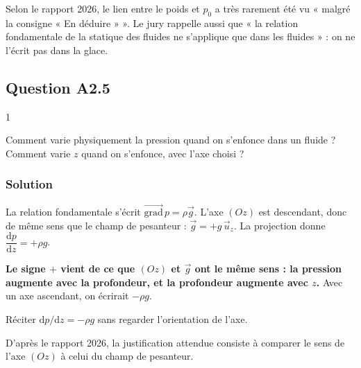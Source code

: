 \documentclass[11pt,a4paper]{article}
\begin{document}
\begin{jury}

Selon le rapport 2026, le lien entre le poids et \(p_0\) a très rarement été vu « malgré la consigne « En déduire » ». Le jury rappelle aussi que « la relation fondamentale de la statique des fluides ne s'applique que dans les fluides » : on ne l'écrit pas dans la glace.

\end{jury}

\hypertarget{question-a2.5}{%
\subsection{Question A2.5}\label{question-a2.5}}

\begin{indication}{1}

Comment varie physiquement la pression quand on s'enfonce dans un fluide ? Comment varie \(z\) quand on s'enfonce, avec l'axe choisi ?

\end{indication}

\hypertarget{solution-13}{%
\subsubsection{Solution}\label{solution-13}}

La relation fondamentale s'écrit \(\overrightarrow{\mathrm{grad}}\,p = \rho\vec g\). L'axe \((Oz)\) est descendant, donc de même sens que le champ de pesanteur : \(\vec g = +g\,\vec u_z\). La projection donne \(\dfrac{\mathrm{d}p}{\mathrm{d}z} = +\rho g\).

\textbf{Le signe \(+\) vient de ce que \((Oz)\) et \(\vec g\) ont le même sens : la pression augmente avec la profondeur, et la profondeur augmente avec \(z\).} Avec un axe ascendant, on écrirait \(-\rho g\).

\begin{piege}

Réciter \(\mathrm{d}p/\mathrm{d}z = -\rho g\) sans regarder l'orientation de l'axe.

\end{piege}

\begin{jury}

D'après le rapport 2026, la justification attendue consiste à comparer le sens de l'axe \((Oz)\) à celui du champ de pesanteur.

\end{jury}
\end{document}
